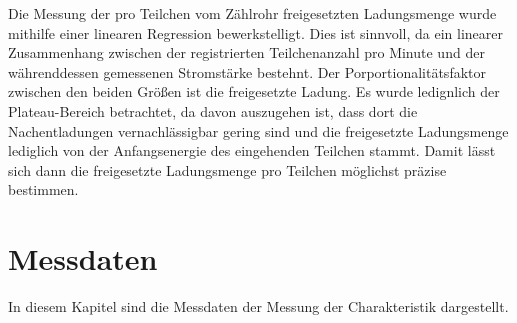 Die Messung der pro Teilchen vom Zählrohr freigesetzten Ladungsmenge wurde mithilfe
einer linearen Regression bewerkstelligt. Dies ist sinnvoll, da ein linearer
Zusammenhang zwischen der registrierten Teilchenanzahl pro Minute und der
währenddessen gemessenen Stromstärke bestehnt.
Der Porportionalitätsfaktor zwischen den beiden Größen ist die freigesetzte
Ladung. Es wurde ledignlich der Plateau-Bereich betrachtet, da davon auszugehen
ist, dass dort die Nachentladungen vernachlässigbar gering sind und die
freigesetzte Ladungsmenge lediglich von der Anfangsenergie des eingehenden
Teilchen stammt. Damit lässt sich dann die freigesetzte Ladungsmenge pro Teilchen
möglichst präzise bestimmen.


\section{Messdaten}

In diesem Kapitel sind die Messdaten der Messung der Charakteristik dargestellt.





